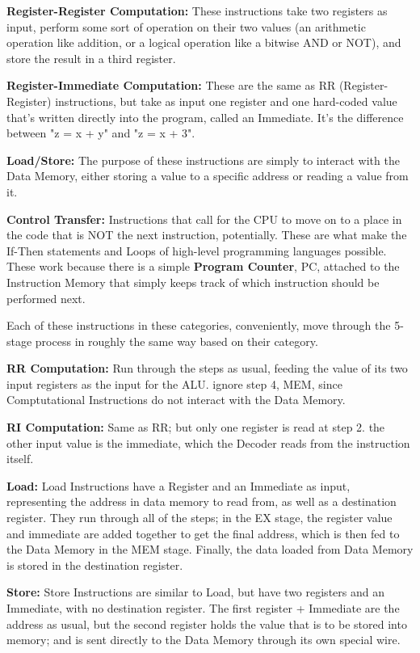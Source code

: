 \documentclass[12pt,twoside]{reedthesis}
\begin{document}
\textbf{Register-Register Computation:} These instructions take two registers as input, perform some sort of operation on their two values (an arithmetic operation like addition, or a logical operation like a bitwise AND or NOT), and store the result in a third register.

\textbf{Register-Immediate Computation:} These are the same as RR (Register-Register) instructions, but take as input one register and one hard-coded value that's written directly into the program, called an Immediate. It's the difference between "z = x + y" and "z = x + 3".

\textbf{Load/Store:} The purpose of these instructions are simply to interact with the Data Memory, either storing a value to a specific address or reading a value from it.

\textbf{Control Transfer:} Instructions that call for the CPU to move on to a place in the code that is NOT the next instruction, potentially. These are what make the If-Then statements and Loops of high-level programming languages possible. These work because there is a simple \textbf{Program Counter}, PC, attached to the Instruction Memory that simply keeps track of which instruction should be performed next.

Each of these instructions in these categories, conveniently, move through the 5-stage process in roughly the same way based on their category.

\textbf{RR Computation:} Run through the steps as usual, feeding the value of its two input registers as the input for the ALU. ignore step 4, MEM, since Comptutational Instructions do not interact with the Data Memory.

\textbf{RI Computation:} Same as RR; but only one register is read at step 2. the other input value is the immediate, which the Decoder reads from the instruction itself.

\textbf{Load:} Load Instructions have a Register and an Immediate as input, representing the address in data memory to read from, as well as a destination register. They run through all of the steps; in the EX stage, the register value and immediate are added together to get the final address, which is then fed to the Data Memory in the MEM stage. Finally, the data loaded from Data Memory is stored in the destination register.

\textbf{Store:} Store Instructions are similar to Load, but have two registers and an Immediate, with no destination register. The first register + Immediate are the address as usual, but the second register holds the value that is to be stored into memory; and is sent directly to the Data Memory through its own special wire.
\end{document}
